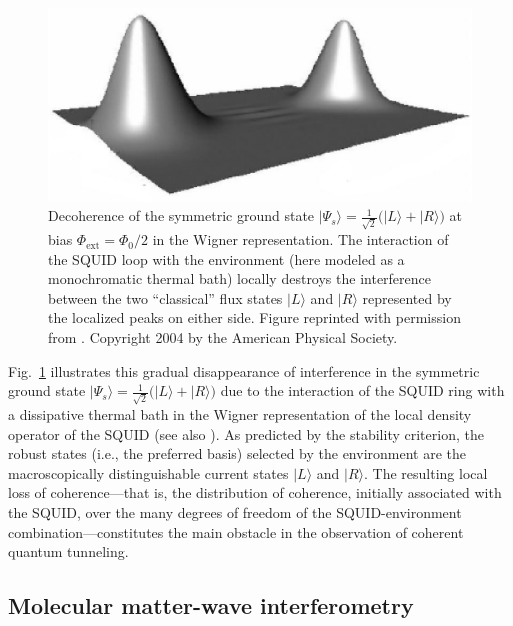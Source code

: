 \documentclass[12pt,aps,floatfix,amsmath,amssymb,showpacs,nofootinbib]{revtex4-2}
\newcommand{\ket}[1]{\ensuremath{|{#1\rangle}}}
\begin{document}
\begin{figure}
\begin{center}
 \includegraphics[scale=.2]{squid-dec5-n.eps}
\end{center}
\caption[Decoherence of the symmetric
ground state $\ket{\Psi_s} = \frac{1}{\sqrt{2}} \bigl( \ket{L} +
\ket{R} \bigr)$ at bias $\Phi_\text{ext} = \Phi_0/2$ in a
SQUID]{\label{fig:squid-dec}Decoherence of the symmetric ground state
  $\ket{\Psi_s} = \frac{1}{\sqrt{2}} \bigl( \ket{L} + \ket{R} \bigr)$
  at bias $\Phi_\text{ext} = \Phi_0/2$ in the Wigner representation.
  The interaction of the SQUID loop with the environment (here modeled
  as a monochromatic thermal bath) locally destroys the interference
  between the two ``classical'' flux states $\ket{L}$ and $\ket{R}$
  represented by the localized peaks on either side. Figure reprinted
  with permission from \cite{Everitt:2004:mb}. Copyright
  2004 by the American Physical Society.  }
\end{figure}


Fig.~\ref{fig:squid-dec} illustrates this gradual disappearance of
interference in the symmetric ground state $\ket{\Psi_s} =
\frac{1}{\sqrt{2}} \bigl( \ket{L} + \ket{R} \bigr)$ due to the
interaction of the SQUID ring with a dissipative thermal bath in the
Wigner representation of the local density operator of the SQUID
\cite{Everitt:2004:mb} (see also \cite{Chudnovsky:2003:un}). As
predicted by the stability criterion, the robust states (i.e., the
preferred basis) selected by the environment are the macroscopically
distinguishable current states $\ket{L}$ and $\ket{R}$. The resulting
local loss of coherence---that is, the distribution of coherence,
initially associated with the SQUID, over the many degrees of freedom
of the SQUID-environment combination---constitutes the main obstacle
in the observation of coherent quantum tunneling.


\subsection{Molecular matter-wave interferometry} \label{sec:mol-interference}
\end{document}
